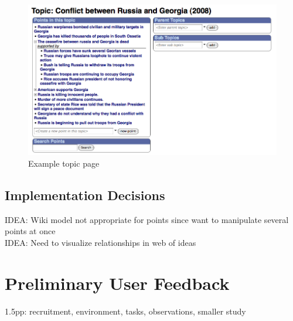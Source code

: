 \documentclass{chi2009}
\newcommand{\idea}[1]{{\color{blue} IDEA: #1}\\}
\begin{document}
\begin{figure}[ht]
	\includegraphics[scale=0.3]{../screenshots/topicpage_sm.jpg}
	\caption{Example topic page}
	\label{topicpage}
\end{figure}

\subsection{Implementation Decisions}

\idea{Wiki model not appropriate for points since want to manipulate several points at once}
\idea{Need to visualize relationships in web of ideas}


% 
% 
% 
% 


\section{Preliminary User Feedback}


1.5pp: recruitment, environment, tasks, observations, smaller study
\end{document}
